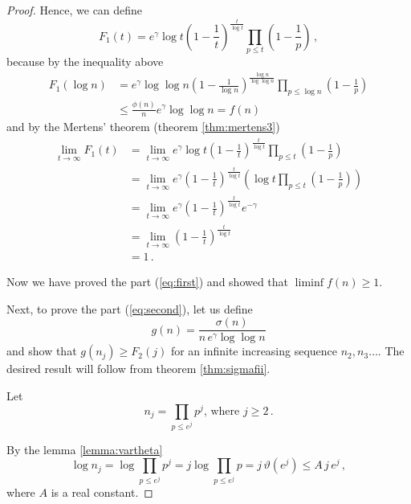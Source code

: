 \documentclass{article}
\begin{document}
\begin{theorem}
\begin{proof}
Hence, we can define
\begin{equation*}
    F_1(t)=e^\gamma \log t \left(1-\frac{1}{t}\right)^\frac{t}{\log t} \prod_{p\leq t} \left(1-\frac{1}{p}\right)\,,
\end{equation*}
because by the inequality above
\begin{align*}
    F_1(\log n) & = e^\gamma \log \log n \left(1-\frac{1}{\log n}\right)^\frac{\log n}{\log \log n} \prod_{p\leq \log n} \left(1-\frac{1}{p}\right)\\
    & \leq \frac{\phi(n)}{n} e^\gamma \log\log n = f(n)
\end{align*}
and by the Mertens' theorem (theorem \ref{thm:mertens3})
\begin{align*}
    \lim_{t \rightarrow \infty} F_1(t) & = \lim_{t \rightarrow \infty} e^\gamma \log t \left(1-\frac{1}{t}\right)^\frac{t}{\log t} \prod_{p\leq t} \left(1-\frac{1}{p}\right)\\
    & = \lim_{t \rightarrow \infty} e^\gamma \left( 1-\frac{1}{t}\right)^\frac{t}{\log t} \left(\log t \prod_{p\leq t} \left(1-\frac{1}{p}\right) \right)\\
    & = \lim_{t \rightarrow \infty} e^\gamma \left( 1-\frac{1}{t}\right)^\frac{t}{\log t} e^{-\gamma}\\
    & = \lim_{t \rightarrow \infty} \left( 1-\frac{1}{t}\right)^\frac{t}{\log t}\\
    & = 1\,.
\end{align*}

Now we have proved the part (\ref{eq:first}) and showed that
$\liminf{f(n)}\geq 1$.

Next, to prove the part (\ref{eq:second}), let us define
\begin{equation*}
    g(n)=\frac{\sigma(n)}{n\,e^\gamma \log\log n}
\end{equation*}
and show that $g(n_j) \geq F_2(j)$ for an infinite increasing sequence $n_2,n_3\dots$. The desired result will follow from theorem \ref{thm:sigmafii}.

Let
\begin{equation*}
    n_j=\prod_{p\leq e^j} p^j\text{, where } j\geq 2\,.
\end{equation*}

By the lemma \ref{lemma:vartheta}
\begin{equation*}
    \log n_j = \log \prod_{p\leq e^j} p^j = j \log \prod_{p\leq e^j} p = j\,\vartheta(e^j) \leq A\,j\,e^j\,,
\end{equation*}
where $A$ is a real constant.


\end{proof}
\end{theorem}
\end{document}
